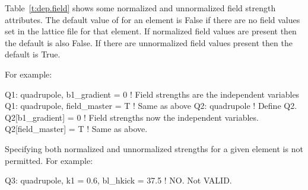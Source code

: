 Table~\ref{t:dep.field} shows some normalized and unnormalized field strength attributes.  The
default value of  for an element is False if there are no field values set in the
lattice file for that element. If normalized field values are present then the default is also False.
If there are unnormalized field values present then the default is True.

For example:
\begin{example}
  Q1: quadrupole, b1_gradient = 0   ! Field strengths are the independent variables
  Q1: quadrupole, field_master = T  ! Same as above
  Q2: quadrupole        ! Define Q2.
  Q2[b1_gradient] = 0   ! Field strengths now the independent variables.
  Q2[field_master] = T  ! Same as above.
\end{example}

Specifying both normalized and unnormalized strengths for a given element is not
permitted. For example:
\begin{example}
  Q3: quadrupole, k1 = 0.6, bl_hkick = 37.5  ! NO. Not VALID.
\end{example}

\begin{table}[ht]
\caption {Example normalized and unnormalized field strength attributes.}
\label{t:dep.field}
\end{table}

